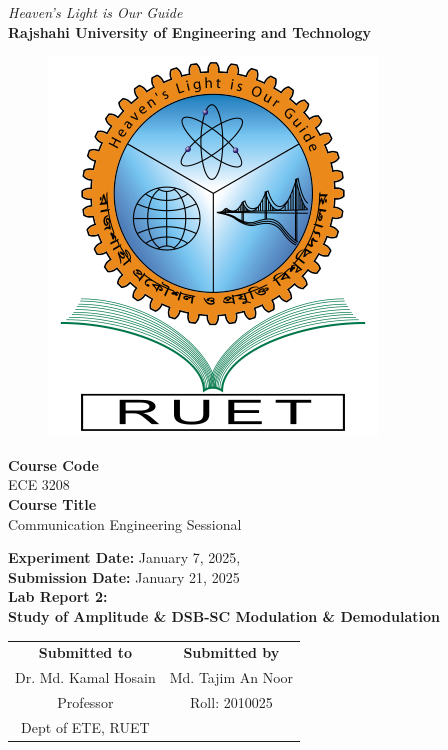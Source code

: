 \vspace*{\fill}
\begin{center}

    \emph{Heaven's Light is Our Guide} \\
    \textbf{Rajshahi University of Engineering and Technology} \\

    \begin{figure}[H]
        \centering
        \includegraphics[scale=.34]{images/RUET_logo.png}
        \label{fig:ruet_logo}
    \end{figure}
    \vspace{5mm}

    \textbf{Course Code}\\
    ECE 3208\\
    \vspace{3mm}
    \textbf{Course Title}\\
    Communication Engineering Sessional

    \vspace{5mm}
    \textbf{Experiment Date:} {January 7, 2025},\\
    \textbf{Submission Date:} {January 21, 2025}\\

    \vspace{5mm}
    \textbf{Lab Report 2: \\
        Study of Amplitude \& DSB-SC Modulation \& Demodulation}

    \vspace{15mm}

    \begin{tabular}{c|c}
        \textbf{Submitted to} & \textbf{Submitted by} \\
        Dr. Md. Kamal Hosain  & Md. Tajim An Noor     \\
        Professor             & Roll: 2010025         \\
        Dept of ETE, RUET     &                       \\
    \end{tabular}

\end{center}
\vspace*{\fill}
